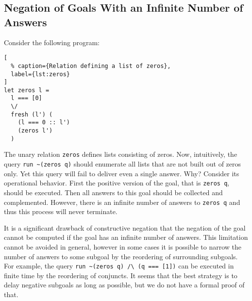 \subsection{Negation of Goals With an Infinite Number of Answers}

Consider the following program:

\begin{minipage}[h]{\textwidth}
\begin{lstlisting}[
  % caption={Relation defining a list of zeros},
  label={lst:zeros}
]
let zeros l =
  l === [0] 
  \/
  fresh (l') (
    (l === 0 :: l')
    (zeros l')
  )
\end{lstlisting}
\end{minipage}

The unary relation \lstinline{zeros} defines lists consisting of zeros.
Now, intuitively, the query \lstinline{run ~(zeros q)} should enumerate
all lists that are not built out of zeros only.
Yet this query will fail to deliver even a single answer.
Why? Consider its operational behavior.
First the positive version of the goal, that is \lstinline{zeros q}, should be executed.
Then all answers to this goal should be collected and complemented.
However, there is an infinite number of answers to \lstinline{zeros q}
and thus this process will never terminate. 

It is a significant drawback of constructive negation
that the negation of the goal cannot be computed
if the goal has an infinite number of answers.
This limitation cannot be avoided in general,
however in some cases it is possible to narrow 
the number of answers to some subgoal 
by the reordering of surrounding subgoals.
For example, the query \lstinline{run ~(zeros q) /\ (q === [1])}
can be executed in finite time by the reordering of conjuncts.
It seems that the best strategy is to delay 
negative subgoals as long as possible,
but we do not have a formal proof of that.
